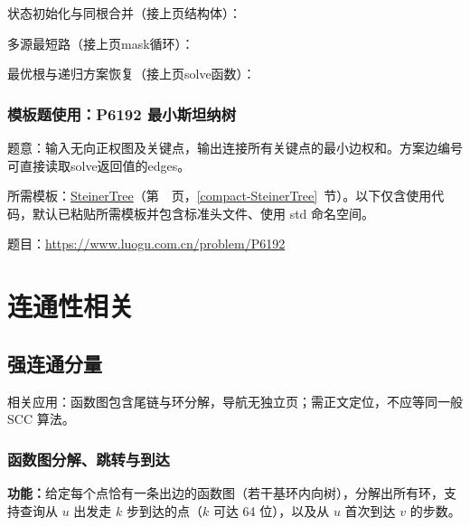 \newpage\noindent 状态初始化与同根合并（接上页结构体）：



\newpage\noindent 多源最短路（接上页mask循环）：



\newpage\noindent 最优根与递归方案恢复（接上页solve函数）：



\Needspace{400pt}

\subsection*{模板题使用：P6192 最小斯坦纳树}

\label{usage-example-391}

题意：输入无向正权图及关键点，输出连接所有关键点的最小边权和。方案边编号可直接读取solve返回值的edges。

所需模板：\hyperref[compact-SteinerTree]{SteinerTree}（第~\pageref{compact-SteinerTree}~页，\ref{compact-SteinerTree}~节）。以下仅含使用代码，默认已粘贴所需模板并包含标准头文件、使用 std 命名空间。

题目：\url{https://www.luogu.com.cn/problem/P6192}



\Needspace{180pt}

\chapter{连通性相关}

\section{强连通分量}

\noindent 相关应用：函数图包含尾链与环分解，导航无独立页；需正文定位，不应等同一般 SCC 算法。

\subsection{函数图分解、跳转与到达}\label{compact-FunctionalGraph}

\noindent\textbf{功能：}\allowbreak 给定每个点恰有一条出边的函数图（若干基环内向树），分解出所有环，支持查询从 $u$ 出发走 $k$ 步到达的点（$k$ 可达 64 位），以及从 $u$ 首次到达 $v$ 的步数。

